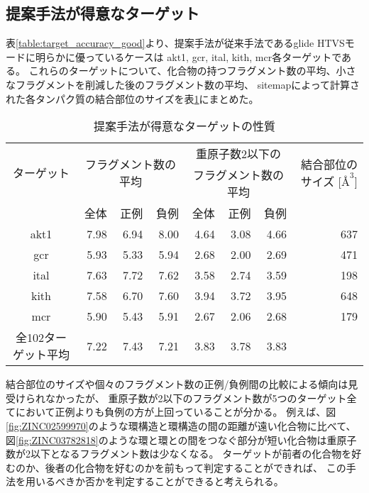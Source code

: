 \subsection{提案手法が得意なターゲット}
表\ref{table:target_accuracy_good}より、提案手法が従来手法であるglide HTVSモードに明らかに優っているケースは
akt1, gcr, ital, kith, mcr各ターゲットである。
これらのターゲットについて、化合物の持つフラグメント数の平均、小さなフラグメントを削減した後のフラグメント数の平均、
sitemapによって計算された各タンパク質の結合部位のサイズを表\ref{table:good_property}にまとめた。
\begin{table}[htb] \centering
	\caption{提案手法が得意なターゲットの性質}
	\label{table:good_property}
	\begin{tabular}{c|rrrrrrr}
	\hline
	\multirow{2}{*}{ターゲット}	&\multicolumn{3}{c}{\multirow{2}{*}{フラグメント数の平均}}	&\multicolumn{3}{c}{重原子数2以下の}		&\multirow{2}{*}{結合部位のサイズ [$Å^3$]}	\\
							&		&		&								&\multicolumn{3}{c}{フラグメント数の平均}	&										\\
							&全体	&正例	&負例							&全体	&正例		&負例			&										\\ \hline
	akt1						&7.98	&6.94	&8.00							&4.64	&3.08		&4.66			&637									\\
	gcr						&5.93	&5.33	&5.94							&2.68	&2.00		&2.69			&471									\\
	ital						&7.63	&7.72	&7.62							&3.58	&2.74		&3.59			&198									\\
	kith						&7.58	&6.70	&7.60							&3.94	&3.72		&3.95			&648									\\
	mcr						&5.90	&5.43	&5.91							&2.67	&2.06		&2.68			&179									\\ \hline
	全102ターゲット平均		&7.22	&7.43	&7.21							&3.83	&3.78		&3.83			&\todo{算出}								\\ \hline
	\end{tabular}
\end{table}
結合部位のサイズや個々のフラグメント数の正例/負例間の比較による傾向は見受けられなかったが、
重原子数が2以下のフラグメント数が5つのターゲット全てにおいて正例よりも負例の方が上回っていることが分かる。
例えば、図\ref{fig:ZINC02599970}のような環構造と環構造の間の距離が遠い化合物に比べて、
図\ref{fig:ZINC03782818}のような環と環との間をつなぐ部分が短い化合物は重原子数が2以下となるフラグメント数は少なくなる。
ターゲットが前者の化合物を好むのか、後者の化合物を好むのかを前もって判定することができれば、
この手法を用いるべきか否かを判定することができると考えられる。

